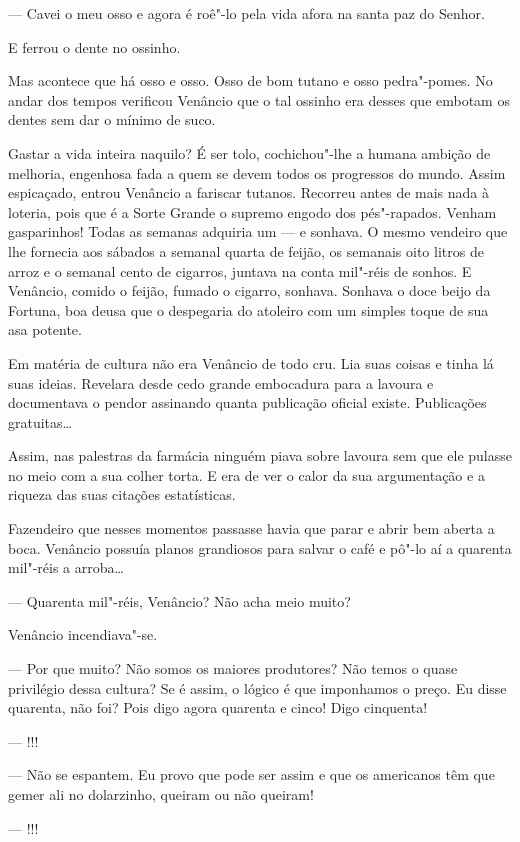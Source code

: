 --- Cavei o meu osso e agora é roê"-lo pela vida afora na santa paz do
Senhor.

E ferrou o dente no ossinho.

Mas acontece que há osso e osso. Osso de bom tutano e osso pedra"-pomes.
No andar dos tempos verificou Venâncio que o tal ossinho era desses que
embotam os dentes sem dar o mínimo de suco.

Gastar a vida inteira naquilo? É ser tolo, cochichou"-lhe a humana
ambição de melhoria, engenhosa fada a quem se devem todos os progressos
do mundo. Assim espicaçado, entrou Venâncio a fariscar tutanos. Recorreu
antes de mais nada à loteria, pois que é a Sorte Grande o supremo engodo
dos pés"-rapados. Venham gasparinhos! Todas as semanas adquiria um --- e
sonhava. O mesmo vendeiro que lhe fornecia aos sábados a semanal quarta
de feijão, os semanais oito litros de arroz e o semanal cento de
cigarros, juntava na conta mil"-réis de sonhos. E Venâncio, comido o
feijão, fumado o cigarro, sonhava. Sonhava o doce beijo da Fortuna, boa
deusa que o despegaria do atoleiro com um simples toque de sua asa
potente.

Em matéria de cultura não era Venâncio de todo cru. Lia suas coisas e
tinha lá suas ideias. Revelara desde cedo grande embocadura para a
lavoura e documentava o pendor assinando quanta publicação oficial
existe. Publicações gratuitas\ldots{}

Assim, nas palestras da farmácia ninguém piava sobre lavoura sem que ele
pulasse no meio com a sua colher torta. E era de ver o calor da sua
argumentação e a riqueza das suas citações estatísticas.

Fazendeiro que nesses momentos passasse havia que parar e abrir bem
aberta a boca. Venâncio possuía planos grandiosos para salvar o café e
pô"-lo aí a quarenta mil"-réis a arroba\ldots{}

--- Quarenta mil"-réis, Venâncio? Não acha meio muito?

Venâncio incendiava"-se.

--- Por que muito? Não somos os maiores produtores? Não temos o quase
privilégio dessa cultura? Se é assim, o lógico é que imponhamos o preço.
Eu disse quarenta, não foi? Pois digo agora quarenta e cinco! Digo
cinquenta!

--- !!!

--- Não se espantem. Eu provo que pode ser assim e que os americanos têm
que gemer ali no dolarzinho, queiram ou não queiram!

--- !!!

